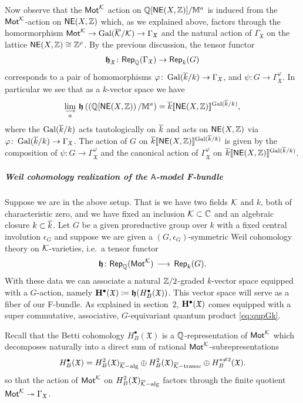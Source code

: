 \documentclass[twoside,leqno]{article}
\numberwithin{equation}{section}
\theoremstyle{plain}
\theoremstyle{definition}
\begin{document}
Now observe that the $\mathsf{Mot}^{\mathcal K}$ action on
$\mathbb Q[\mathsf{NE}(X,\mathbb Z)]/\mathbb{M}^{a}$ is induced from the
$\mathsf{Mot}^{\mathcal K}$-action on $\mathsf{NE}(X,\mathbb Z)$ which, as we explained
above, factors through the homormorphism $\mathsf{Mot}^{\mathcal K} \to
\operatorname{Gal}(\overline{\mathcal K}/\mathcal K) \to \Gamma_{\mathfrak{X}}$ and the natural action
of $\Gamma_{\mathfrak{X}}$ on the lattice $\mathsf{NE}(X,\mathbb Z) \cong
\mathbb Z^{\rho}$. By the previous discussion, the tensor functor
\[
\boldsymbol{\mathfrak{h}}_{\mathfrak{X}} \colon \mathsf{Rep}_{\mathbb Q}(\Gamma_{\mathfrak{X}}) \to \mathsf{Rep}_{k}(G)
\]
corresponds to a pair of homomorphisms $\varphi \colon \operatorname{Gal}(\overline{k}/k) \to
\Gamma_{\mathfrak{X}}$, and $\psi \colon G \to
  \Gamma_{\mathfrak{X}}^{\varphi}$. In particular we see that as a
  $k$-vector space
we have
  \[
  \lim_{\substack{\longrightarrow \\ a}} \,
  \boldsymbol{\mathfrak{h}}\left(\left(\mathbb Q[\mathsf{NE}(X,\mathbb Z)\right)/\mathbb{M}^{a}\right)
    = \overline{k}[\![\mathsf{NE}(X,\mathbb Z)]\!]^{\operatorname{Gal}(\overline{k}/k)},
    \]
    where the $\operatorname{Gal}(\overline{k}/k)$ acts tautologically on $\overline{k}$ and acts
    on $\mathsf{NE}(X,\mathbb Z)$ via $\varphi \colon \operatorname{Gal}(\overline{k}/k) \to
    \Gamma_{\mathfrak{X}}$. The action of $G$ on
    $\overline{k}[\![\mathsf{NE}(X,\mathbb Z)]\!]^{\operatorname{Gal}(\overline{k}/k)}$ is given by the
    composition of $\psi \colon G \to \Gamma_{\mathfrak{X}}^{\varphi}$ and
    the canonical action of $\Gamma_{\mathfrak{X}}^{\varphi}$ on
    $\overline{k}[\![\mathsf{NE}(X,\mathbb Z)]\!]^{\operatorname{Gal}(\overline{k}/k)}$.

\subparagraph{Weil cohomology realization of the \texorpdfstring{$\mathsf{A}$}{A}-model F-bundle} \label{subpar:twistF}

Suppose we are in the above setup. That is we have two fields $\mathcal K$
and $k$, both of characteristic zero, and we have fixed an inclusion
$\mathcal K \subset \mathbb C$ and an algebraic closure $k \subset \overline{k}$.  Let
$G$ be a given proreductive group over $k$ with a fixed central
involution $\epsilon_{G}$ and suppose we are given a
$(G,\epsilon_{G})$-symmetric Weil cohomology theory on
$\mathcal K$-varieties, i.e.\ a tensor functor
\[
\boldsymbol{\mathfrak{h}} \colon \mathsf{Rep}_{\mathbb Q}(\mathsf{Mot}^{\mathcal K}) \,  \longrightarrow \,
\mathsf{Rep}_{k}(G).
\]
With these data we can associate a natural $\mathbb Z/2$-graded $k$-vector
space equipped with a $G$-action, namely $\mathbf{H}^{\bullet}(\mathfrak{X})
\coloneqq \boldsymbol{\mathfrak{h}}(H^{\bullet}_{B}(\mathfrak{X}))$. This vector space will serve
as a fiber of our F-bundle. As explained in section~2,
$\mathbf{H}^{\bullet}(\mathfrak{X})$ comes equipped with a super
commutative, associative, $G$-equivariant quantum product
\eqref{eq:qupGk}.


Recall that the Betti cohomology 
$H^{\bullet}_{B}(\mathfrak{X})$  is a $\mathbb Q$-representation
of $\mathsf{Mot}^{\mathcal K}$ which decomposes naturally into a direct sum of
rational $\mathsf{Mot}^{\mathcal K}$-subrepresentations
\[
H^{\bullet}_{B}(\mathfrak{X}) = H^{2}_{B}(\mathfrak{X})_{\overline{\mathcal K}-\operatorname{alg}} \oplus
H^{2}_{B}(\mathfrak{X})_{\overline{\mathcal K}-\operatorname{transc}} \oplus H^{* \neq
  2}_{B}(\mathfrak{X}).
\]
so that the action of $\mathsf{Mot}^{\mathcal K}$ on
$H^{2}_{B}(\mathfrak{X})_{\overline{\mathcal K}-\operatorname{alg}}$ factors through the
finite quotient $\mathsf{Mot}^{\mathcal K} \twoheadrightarrow
\Gamma_{\mathfrak{X}}$.
\end{document}
